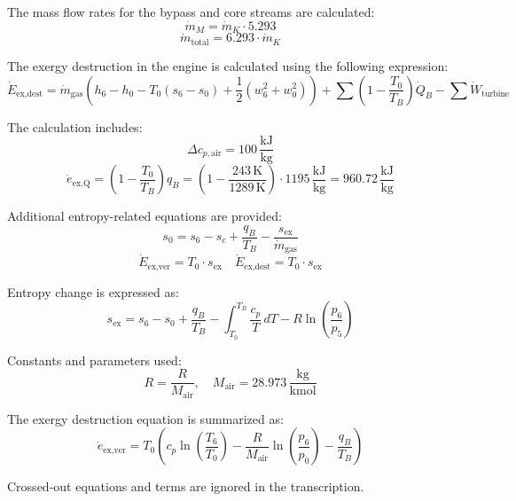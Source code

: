 The mass flow rates for the bypass and core streams are calculated:  
\[
\dot{m}_M = \dot{m}_K \cdot 5.293
\]
\[
\dot{m}_{\text{total}} = 6.293 \cdot \dot{m}_K
\]

The exergy destruction in the engine is calculated using the following expression:  
\[
\dot{E}_{\text{ex,dest}} = \dot{m}_{\text{gas}} \left( h_6 - h_0 - T_0 (s_6 - s_0) + \frac{1}{2} (w_6^2 + w_0^2) \right) + \sum \left( 1 - \frac{T_0}{T_B} \right) \dot{Q}_B - \sum \dot{W}_\text{turbine}
\]

The calculation includes:  
\[
\Delta c_{p,\text{air}} = 100 \, \frac{\text{kJ}}{\text{kg}}
\]
\[
\dot{e}_{\text{ex,Q}} = \left( 1 - \frac{T_0}{T_B} \right) q_B = \left( 1 - \frac{243 \, \text{K}}{1289 \, \text{K}} \right) \cdot 1195 \, \frac{\text{kJ}}{\text{kg}} = 960.72 \, \frac{\text{kJ}}{\text{kg}}
\]

Additional entropy-related equations are provided:  
\[
s_0 = s_6 - s_c + \frac{q_B}{T_B} - \frac{s_{\text{ex}}}{\dot{m}_{\text{gas}}}
\]
\[
\dot{E}_{\text{ex,ver}} = T_0 \cdot s_{\text{ex}} \quad \dot{E}_{\text{ex,dest}} = T_0 \cdot s_{\text{ex}}
\]

Entropy change is expressed as:  
\[
s_{\text{ex}} = s_6 - s_0 + \frac{q_B}{T_B} - \int_{T_0}^{T_B} \frac{c_p}{T} \, dT - R \ln \left( \frac{p_6}{p_5} \right)
\]

Constants and parameters used:  
\[
R = \frac{R}{M_{\text{air}}}, \quad M_{\text{air}} = 28.973 \, \frac{\text{kg}}{\text{kmol}}
\]

The exergy destruction equation is summarized as:  
\[
\dot{e}_{\text{ex,ver}} = T_0 \left( c_p \ln \left( \frac{T_6}{T_0} \right) - \frac{R}{M_{\text{air}}} \ln \left( \frac{p_6}{p_0} \right) - \frac{q_B}{T_B} \right)
\]  

Crossed-out equations and terms are ignored in the transcription.